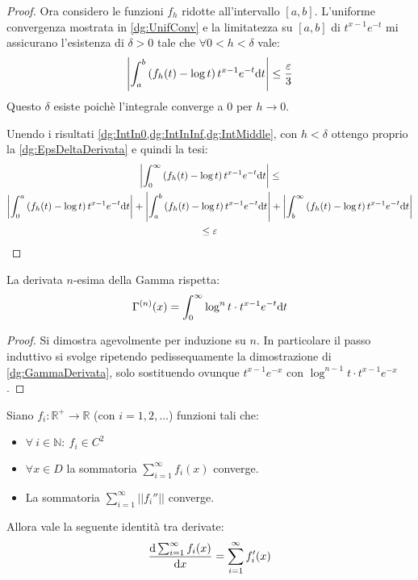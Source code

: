 \begin{proof}
	Ora considero le funzioni $f_h$ ridotte all'intervallo $[a,b]$.
	L'uniforme convergenza mostrata in \cref{dg:UnifConv} e la limitatezza su $[a,b]$ di $t^{x-1}e^{-t}$ mi assicurano
	l'esistenza di $\delta>0$ tale che $\forall 0<h<\delta$ vale:
	\begin{equation}\label{dg:IntMiddle}
		\left\lvert \int_a^b \left(f_h(t)-\log{t}\right)t^{x-1}e^{-t}\mathrm{d} t\right\rvert \le \frac{\varepsilon}3
	\end{equation}
	Questo $\delta$ esiste poichè l'integrale converge a 0 per $h\to 0$.
	
	Unendo i risultati \cref{dg:IntIn0,dg:IntInInf,dg:IntMiddle}, con $h<\delta$ ottengo
	proprio la \cref{dg:EpsDeltaDerivata} e quindi la tesi:
	\begin{multline}
		\left\lvert
		\int_0^{\infty} \left(f_h(t)-\log{t}\right)t^{x-1}e^{-t}\mathrm{d} t
		\right\rvert \le \\
		\left\lvert \int_0^a \left(f_h(t)-\log{t}\right)t^{x-1}e^{-t}\mathrm{d} t\right\rvert +
		\left\lvert \int_a^b \left(f_h(t)-\log{t}\right)t^{x-1}e^{-t}\mathrm{d} t\right\rvert +
		\left\lvert \int_b^{\infty} \left(f_h(t)-\log{t}\right)t^{x-1}e^{-t}\mathrm{d} t\right\rvert \\
		\le \varepsilon
	\end{multline}
\end{proof}
\begin{corollary}\label{dg:GammaDerivataN}
	La derivata $n$-esima della Gamma rispetta:
	\begin{equation*}
		\Gamma^{(n)}(x)=\int_0^{\infty} \log^{n}{t}\cdot t^{x-1}e^{-t}\mathrm{d} t
	\end{equation*}
\end{corollary}
\begin{proof}
	Si dimostra agevolmente per induzione su $n$. In particolare il passo induttivo si svolge
	ripetendo pedissequamente la dimostrazione di \cref{dg:GammaDerivata}, solo sostituendo ovunque $t^{x-1}e^{-x}$
	con $\log^{n-1}{t}\cdot t^{x-1}e^{-x}$.
\end{proof}
\begin{lemma}\label{dg:SommaDer}
	Siano $f_i:\mathbb{R^+}\to\mathbb R$ (con $i=1,2,\dots$) funzioni tali che:
	\begin{itemize}
		\item $\forall\ i\in\mathbb{N} :\ f_i\in C^2$
		\item $\forall x\in D$ la sommatoria $\sum_{i=1}^{\infty}f_i(x)$ converge.
		\item La sommatoria $\sum_{i=1}^{\infty} ||f_i''||$ converge.
	\end{itemize}
	
	Allora vale la seguente identità tra derivate:
	\begin{equation*}
		\frac{\mathrm{d} \sum_{i=1}^{\infty}f_i(x)}{\mathrm{d} x}=\sum_{i=1}^{\infty}f_i'(x)
	\end{equation*}
\end{lemma}
